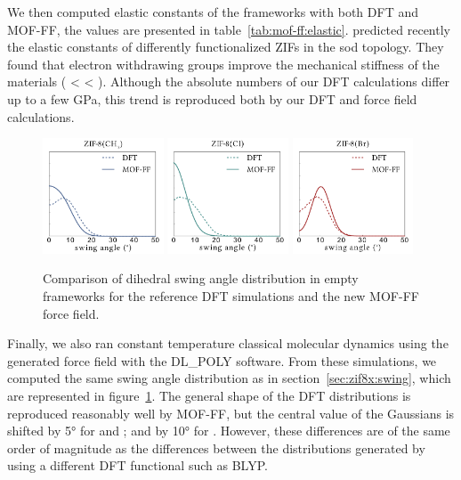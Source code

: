 \documentclass[thesis]{subfiles}
\begin{document}
We then computed elastic constants of the frameworks with both DFT and MOF-FF,
the values are presented in table~\ref{tab:mof-ff:elastic}.
\citeauthor{Zheng2017} predicted recently the elastic constants of differently
functionalized ZIFs in the sod topology\cite{Zheng2017}. They found that
electron withdrawing groups improve the mechanical stiffness of the materials
( < \ZIFCl < \ZIFBr). Although the absolute numbers of our DFT
calculations differ up to a few \si{GPa}, this trend is reproduced both by our
DFT and force field calculations.

\begin{figure}[p]
    \centering
    \includegraphics[width=0.32\textwidth]{figures/images/mof-ff-dihedrals-CH3}
    \includegraphics[width=0.32\textwidth]{figures/images/mof-ff-dihedrals-Cl}
    \includegraphics[width=0.32\textwidth]{figures/images/mof-ff-dihedrals-Br}
    \caption{Comparison of dihedral swing angle distribution in empty frameworks
    for the reference DFT simulations and the new MOF-FF force field.}
    \label{fig:fig:mof-ff:swing}
\end{figure}

Finally, we also ran constant temperature classical molecular dynamics using the
generated force field with the DL\_POLY software. From these simulations, we
computed the same swing angle distribution as in section~\ref{sec:zif8x:swing},
which are represented in figure~\ref{fig:fig:mof-ff:swing}. The general shape of
the DFT distributions is reproduced reasonably well by MOF-FF, but the central
value of the Gaussians is shifted by 5° for \ZIFCl and \ZIFBr; and by 10° for
. However, these differences are of the same order of magnitude as the
differences between the distributions generated by using a different DFT
functional such as BLYP\cite{Coudert2017}.
\end{document}
